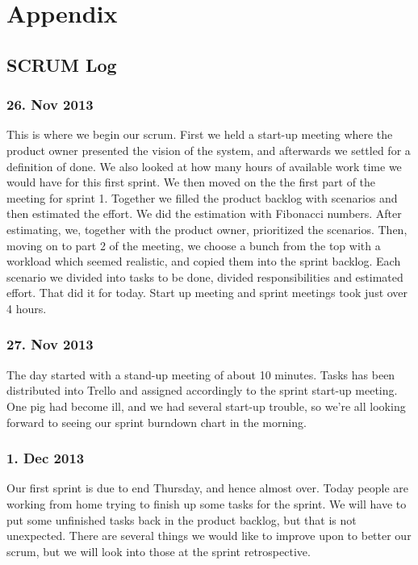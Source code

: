 \chapter{Appendix}

\section{SCRUM Log}
\label{chap:SCRUM Log}

\subsection{26. Nov 2013}
This is where we begin our scrum. First we held a start-up meeting where the product owner presented the vision of the system, and afterwards we settled for a definition of done. We also looked at how many hours of available work time we would have for this first sprint. We then moved on the the first part of the meeting for sprint 1. Together we filled the product backlog with scenarios and then estimated the effort. We did the estimation with Fibonacci numbers. After estimating, we, together with the product owner, prioritized the scenarios. Then, moving on to part 2 of the meeting, we choose a bunch from the top with a workload which seemed realistic, and copied them into the sprint backlog. Each scenario we divided into tasks to be done, divided responsibilities and estimated effort. That did it for today. Start up meeting and sprint meetings took just over 4 hours.


\subsection{27. Nov 2013}
The day started with a stand-up meeting of about 10 minutes. Tasks has been distributed into Trello and assigned accordingly to the sprint start-up meeting. One pig had become ill, and we had several start-up trouble, so we're all looking forward to seeing our sprint burndown chart in the morning.

\subsection{1. Dec 2013}
Our first sprint is due to end Thursday, and hence almost over. Today people are working from home trying to finish up some tasks for the sprint. We will have to put some unfinished tasks back in the product backlog, but that is not unexpected. There are several things we would like to improve upon to better our scrum, but we will look into those at the sprint retrospective.

